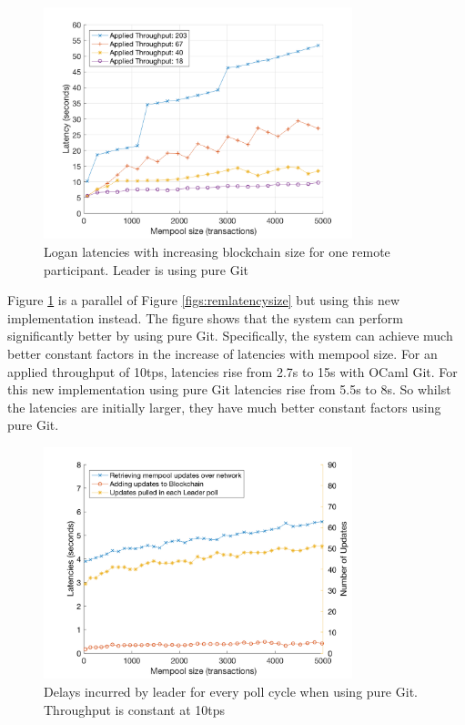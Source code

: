 \documentclass[12pt,a4paper,twoside,openright]{report}
\begin{document}
	\begin{figure} 
		\centering
		\includegraphics[width=0.8\textwidth]{figs/latency_sizes_throughputs.png}
		\caption{Logan latencies with increasing blockchain size for one remote participant. Leader is using pure Git}
		\label{figs:latenciespuregit}
	\end{figure}
	Figure \ref{figs:latenciespuregit} is a parallel of Figure \ref{figs:remlatencysize} but using this new implementation instead. 
	The figure shows that the system can perform significantly better by using pure Git. 
	Specifically, the system can achieve much better constant factors in the increase of latencies with mempool size.
	For an applied throughput of 10tps, latencies rise from 2.7s to 15s with OCaml Git. 
	For this new implementation using pure Git latencies rise from 5.5s to 8s. 
	So whilst the latencies are initially larger, they have much better constant factors using pure Git.
	\begin{figure}
		\centering
		\includegraphics[width=0.8\textwidth]{figs/bottlenecks.png}
		\caption{Delays incurred by leader for every poll cycle when using pure Git. Throughput is constant at 10tps}
		\label{figs:bottleneckspuregit}
	\end{figure}
\end{document}
